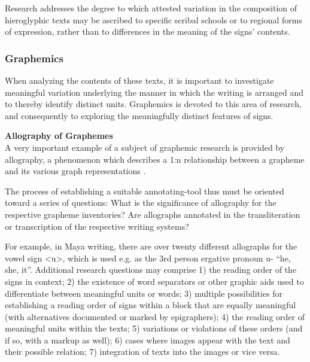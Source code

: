 \documentclass[amsthm,ebook]{saparticle}
\begin{document}
Research addresses the degree to which attested variation in the composition of hieroglyphic texts may be ascribed to
specific scribal schools or to regional forms of expression, rather than to differences in the meaning of the signs’
contents. 




\subsubsection{Graphemics }
When analyzing the contents of these texts, it is important to investigate meaningful variation underlying the manner in
which the writing is arranged and to thereby identify distinct units. 
Graphemics is devoted to this area
of research, and consequently to exploring the meaningfully distinct features of signs. 



\vspace{0.5cm}
\noindent\textbf{Allography of Graphemes }\\
A very important example of a subject of graphemic research is provided by allography, a phenomenon which describes a
1:n relationship between a grapheme and its various graph representations \citep{Crystal1997}. 

The process of establishing a suitable annotating-tool thus must be oriented toward a series of questions: What is the
significance of allography for the respective grapheme inventories? Are allographs annotated in the transliteration or
transcription of the respective writing systems? 

For example, in Maya writing, there are over twenty different allographs for the vowel sign {\textless}u{\textgreater},
which is used e.g. as the 3rd person ergative pronoun u- ``he, she, it''. Additional research questions may comprise 1)
the reading order of the signs in context; 2) the existence of word separators or other graphic aids used to
differentiate between meaningful units or words; 3) multiple possibilities for establishing a reading order of signs
within a block that are equally meaningful (with alternatives documented or marked by epigraphers); 4) the reading
order of meaningful units within the texts; 5) variations or violations of these orders (and if so, with a markup as
well); 6) cases where images appear with the text and their possible relation; 7) integration of texts into the images
or vice versa.
\end{document}
